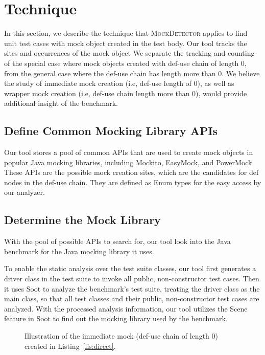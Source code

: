 \section{Technique}
\label{sec:technique}

In this section, we describe the technique that \textsc{MockDetector} applies to find unit test cases with mock object created in the test body. Our tool tracks the sites and occurrences of the mock object  We separate the tracking and counting of the special case where mock objects created with def-use chain of length 0, from the general case where the def-use chain has length more than 0. We believe the study of immediate mock creation (i.e, def-use length of 0), as well as wrapper mock creation (i.e, def-use chain length more than 0), would provide additional insight of the benchmark.

\subsection{Define Common Mocking Library APIs}
\label{subsec:collection}

Our tool stores a pool of common APIs that are used to create mock objects in popular Java mocking libraries, including Mockito, EasyMock, and PowerMock. These APIs are the possible mock creation sites, which are the candidates for def nodes in the def-use chain. They are defined as Enum types for the easy access by our analyzer. 

\subsection{Determine the Mock Library}
\label{subsec:library}

With the pool of possible APIs to search for, our tool look into the Java benchmark for the Java mocking library it uses. 

To enable the static analysis over the test suite classes, our tool first generates a driver class in the test suite to invoke all public, non-constructor test cases. Then it uses Soot to analyze the benchmark's test suite, treating the driver class as the main class, so that all test classes and their public, non-constructor test cases are analyzed. With the processed analysis information, our tool utilizes the Scene feature in Soot to find out the mocking library used by the benchmark.

\begin{figure}
	\centering
	
	\caption{Illustration of the immediate mock (def-use chain of length 0) created in Listing~\ref{lis:direct}.} 
	\label{fig:immediate}
\end{figure}

